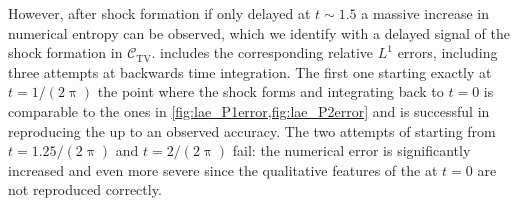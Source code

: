 However, after shock formation \dash{} if only delayed at $t\sim1.5$ \dash{} a massive increase in numerical entropy can be observed, which we identify with a delayed signal of the shock formation in $\mathcal{C}_\mathrm{TV}$.
 includes the corresponding relative $L^1$ errors, including three attempts at backwards time integration. 
The first one starting exactly at  $t=1/(2\uppi)$ \dash{} the point where the shock forms \dash{}  and integrating back to $t=0$ is comparable to the ones in \cref{fig:lae_P1error,fig:lae_P2error} and is successful in reproducing the \ic{} up to an observed accuracy.
The two attempts of starting from $t=1.25/(2\uppi)$ and $t=2/(2\uppi)$ fail: the numerical error is significantly increased and even more severe since the qualitative features of the \ic{} at $t=0$ are not reproduced correctly. 

